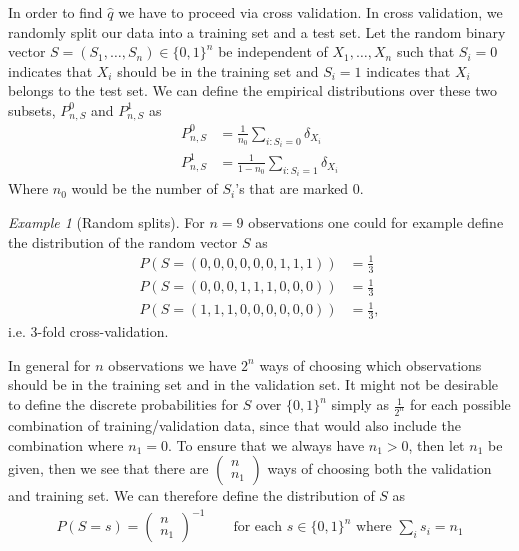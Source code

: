 \documentclass[11pt, a4paper]{article}
\theoremstyle{definition}
\theoremstyle{remark}
\newtheorem{example}{Example}
\newcommand{\cl}{q}
\begin{document}
In order to find $ \hat{\cl}  $ we have to proceed via cross validation. In cross validation, we randomly split our data into a training set and a test set. Let the random binary vector $ S = (S_1,\ldots,S_n) \in \{0,1\}^{n} $ be independent of $ X_1,\ldots, X_n $ such that $ S_i = 0 $ indicates that $ X_i $ should be in the training set and $ S_i = 1 $ indicates that $ X_i $ belongs to the test set. We can define the empirical distributions over these two subsets, $ P_{n,S}^0$ and $ P_{n,S}^{1} $ as
\begin{align*}
    P_{n,S}^{0} &= \frac{1}{n_0} \sum_{i: S_i = 0} \delta_{X_i} \\
    P_{n,S}^{1} &= \frac{1}{1-n_0} \sum_{i: S_i = 1} \delta_{X_i} 
\end{align*}
Where $ n_0 $ would be the number of $ S_i $'s that are marked $ 0 $. 

\begin{example}[Random splits] \label{splits}
    For $ n = 9 $ observations one could for example define the distribution of the random vector $ S $ as 
   \begin{align*}
       P(S = (0, 0, 0, 0, 0, 0, 1, 1, 1)) &= \frac{1}{3} \\
       P(S = (0, 0, 0, 1, 1, 1, 0, 0, 0)) &= \frac{1}{3} \\
       P(S = (1, 1, 1, 0, 0, 0, 0, 0, 0)) &= \frac{1}{3},
   \end{align*}
    i.e. 3-fold cross-validation.

    In general for $ n $ observations we have $ 2^{n} $ ways of choosing which observations should be in the training set and in the validation set. It might not be desirable to define the discrete probabilities for $ S $ over $ \{0,1\}^{n} $ simply as $ \frac{1}{2^{n}} $ for each possible combination of training/validation data, since that would also include the combination where $ n_1 = 0 $. To ensure that we always have $ n_1 > 0 $, then let $ n_1 $ be given, then we see that there are $ \begin{pmatrix}
        n \\ n_1
    \end{pmatrix}$ ways of choosing both the validation and training set. We can therefore define the distribution of $ S $ as 
    \begin{align*}
        P \left(S = s \right) = \begin{pmatrix}
            n \\ n_1
    \end{pmatrix}^{-1} \qquad \text{for each } s \in \{0,1\}^{n} \text{ where } \sum_{i} s_i = n_1
    \end{align*}

\end{example}
\end{document}
